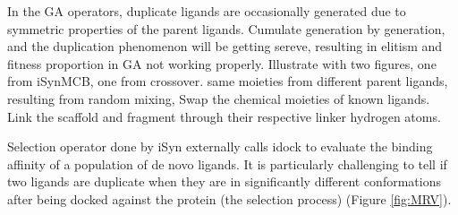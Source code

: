 \documentclass[twocolumn]{svjour3}          %
\begin{document}
In the GA operators, duplicate ligands are occasionally generated due to symmetric properties of the parent ligands. Cumulate generation by generation, and the duplication phenomenon will be getting sereve, resulting in elitism and fitness proportion in GA not working properly. Illustrate with two figures, one from iSynMCB, one from crossover. same moieties from different parent ligands, resulting from random mixing, Swap the chemical moieties of known ligands. Link the scaffold and fragment through their respective linker hydrogen atoms.

Selection operator done by iSyn externally calls idock \cite{1153} to evaluate the binding affinity of a population of de novo ligands. It is particularly challenging to tell if two ligands are duplicate when they are in significantly different conformations after being docked against the protein (the selection process) (Figure \ref{fig:MRV}).
\end{document}
